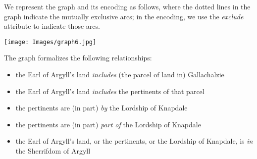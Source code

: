 We represent the graph and its encoding as follows, where the dotted lines in the graph indicate the mutually exclusive arcs; in the encoding, we use the {\itshape exclude} attribute to indicate those arcs.\par
 \noindent\texttt{[image: Images/graph6.jpg]}\par
The graph formalizes the following relationships: \begin{itemize}
\item the Earl of Argyll's land \textit{includes} (the parcel of land in) Gallachalzie
\item the Earl of Argyll's land \textit{includes} the pertinents of that parcel
\item the pertinents are (in part) \textit{by} the Lordship of Knapdale
\item the pertinents are (in part) \textit{part of} the Lordship of Knapdale
\item the Earl of Argyll's land, or the pertinents, or the Lordship of Knapdale, is \textit{in} the Sherrifdom of Argyll

\end{itemize}
